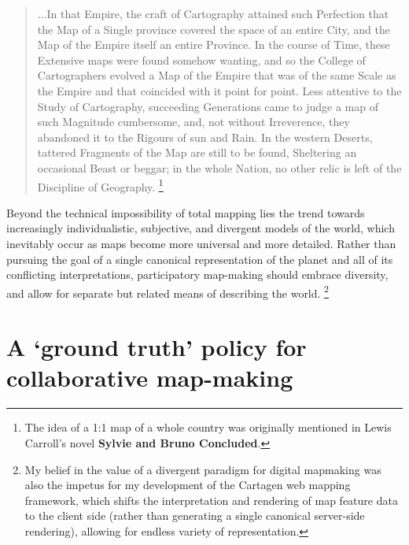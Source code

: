 \documentclass[11pt,oneside,notitlepage]{report}
\begin{document}
\begin{quote}
...In that Empire, the craft of Cartography attained such Perfection that the Map of a Single province covered the space of an entire City, and the Map of the Empire itself an entire Province. In the course of Time, these Extensive maps were found somehow wanting, and so the College of Cartographers evolved a Map of the Empire that was of the same Scale as the Empire and that coincided with it point for point. Less attentive to the Study of Cartography, succeeding Generations came to judge a map of such Magnitude cumbersome, and, not without Irreverence, they abandoned it to the Rigours of sun and Rain. In the western Deserts, tattered Fragments of the Map are still to be found, Sheltering an occasional Beast or beggar; in the whole Nation, no other relic is left of the Discipline of Geography.
\cite{borges1946exactitude} \footnote{The idea of a 1:1 map of a whole country was originally mentioned in Lewis Carroll's novel \textbf{Sylvie and Bruno Concluded}.} 
\end{quote}

Beyond the technical impossibility of total mapping lies the trend towards increasingly individualistic, subjective, and divergent models of the world, which inevitably occur as maps become more universal and more detailed. Rather than pursuing the goal of a single canonical representation of the planet and all of its conflicting interpretations, participatory map-making should embrace diversity, and allow for separate but related means of describing the world. \footnote{My belief in the value of a divergent paradigm for digital mapmaking was also the impetus for my development of the Cartagen web mapping framework, which shifts the interpretation and rendering of map feature data to the client side (rather than generating a single canonical server-side rendering), allowing for endless variety of representation.} 

\section{A `ground truth' policy for collaborative map-making}
\end{document}
